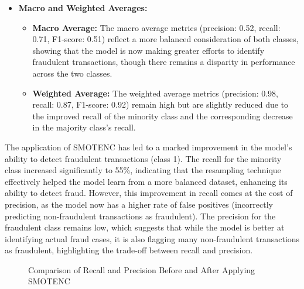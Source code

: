 \documentclass[12pt,a4paper]{report}
\begin{document}
\begin{itemize}
    \item \textbf{Macro and Weighted Averages:}
    \begin{itemize}
        \item \textbf{Macro Average:} The macro average metrics (precision: 0.52, recall: 0.71, F1-score: 0.51) reflect a more balanced consideration of both classes, showing that the model is now making greater efforts to identify fraudulent transactions, though there remains a disparity in performance across the two classes.
        \item \textbf{Weighted Average:} The weighted average metrics (precision: 0.98, recall: 0.87, F1-score: 0.92) remain high but are slightly reduced due to the improved recall of the minority class and the corresponding decrease in the majority class's recall.
    \end{itemize}
\end{itemize}


The application of SMOTENC has led to a marked improvement in the model’s ability to detect fraudulent transactions (class 1). The recall for the minority class increased significantly to 55\%, indicating that the resampling technique effectively helped the model learn from a more balanced dataset, enhancing its ability to detect fraud. However, this improvement in recall comes at the cost of precision, as the model now has a higher rate of false positives (incorrectly predicting non-fraudulent transactions as fraudulent). The precision for the fraudulent class remains low, which suggests that while the model is better at identifying actual fraud cases, it is also flagging many non-fraudulent transactions as fraudulent, highlighting the trade-off between recall and precision.\\

\begin{figure}[ht]
    \centering
    \caption{Comparison of Recall and Precision Before and After Applying SMOTENC}
    \label{fig:smotenc_performance}
\end{figure}
\end{document}
